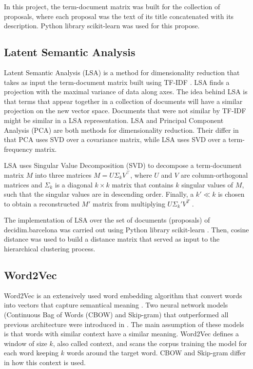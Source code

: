 In this project, the term-document matrix was built for the collection of proposals, where each proposal was the text of its title concatenated with its description. Python library scikit-learn \cite{scikit-learn} was used for this propose.  

\subsection{Latent Semantic Analysis}
Latent Semantic Analysis (LSA) is a method for dimensionality reduction that takes as input the term-document matrix built using TF-IDF \cite{lsa}. LSA finds a projection with the maximal variance of data along axes. The idea behind LSA is that terms that appear together in a collection of documents will have a similar projection on the new vector space. Documents that were not similar by TF-IDF might be similar in a LSA representation. LSA and Principal Component Analysis (PCA) are both methods for dimensionality reduction. Their differ in that PCA uses SVD over a covariance matrix, while LSA uses SVD over a term-frequency matrix.

LSA uses Singular Value Decomposition (SVD) to decompose a term-document matrix $M$ into three matrices $M = U \Sigma_k V^\top$, where $U$ and $V$ are column-orthogonal matrices and $\Sigma_k$ is a diagonal $k \times k$ matrix that contains $k$ singular values of $M$, such that the singular values are in descending order. Finally, a $k' \ll k$ is chosen to obtain a reconstructed $M'$ matrix from multiplying $U \Sigma_k' V ^T $ \cite{clust.short.text}. 

The implementation of LSA over the set of documents (proposals) of decidim.barcelona was carried out using Python library scikit-learn \cite{scikit-learn}. Then, cosine distance was used to build a distance matrix that served as input to the hierarchical clustering process.
\subsection{Word2Vec}
Word2Vec is an extensively used word embedding algorithm that convert words into vectors that capture semantical meaning \cite{semantic.short}. 
Two neural network models (Continuous Bag of Words (CBOW) and Skip-gram) that outperformed all previous architecture were introduced in \cite{mikolov2013}.
The main assumption of these models is that words with similar context have a similar meaning. Word2Vec defines a window of size $k$, also called context, and scans the corpus training the model for each word keeping $k$ words around the target word. CBOW and Skip-gram differ in how this context is used.

